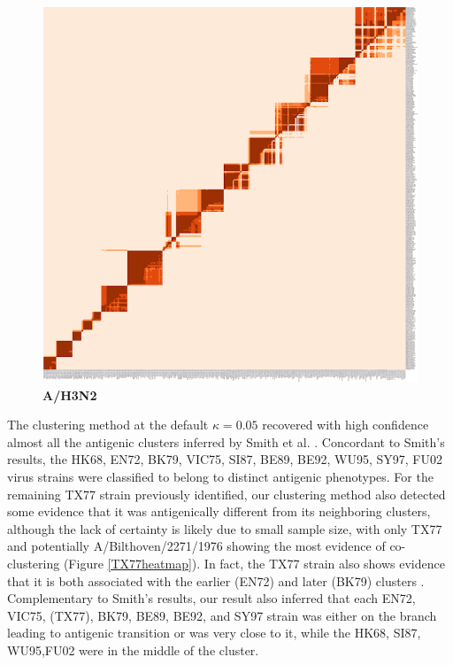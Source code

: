 \documentclass[11pt,oneside,letterpaper]{article}
\begin{document}
\begin{figure}[h]
	\centering		
	\includegraphics[width=1\textwidth]{figures/custom/H3N2Heatmap}
	\caption{\textbf{A/H3N2}
	 		} 
	\label{H3N2heatmap} 
\end{figure}



The clustering method at the default $\kappa=0.05$ recovered with high confidence almost all the  antigenic clusters inferred by Smith et al. \cite{smith_mapping_2004}. 
Concordant to Smith's results, the HK68, EN72, BK79, VIC75, SI87, BE89, BE92, WU95, SY97, FU02 virus strains were classified to belong to distinct antigenic phenotypes. %
For the remaining TX77 strain previously identified, our clustering method also detected some evidence that it was antigenically different from its neighboring clusters, although the lack of certainty is likely due to small sample size, with only TX77 and potentially A/Bilthoven/2271/1976 showing the most evidence of co-clustering (Figure \ref{TX77heatmap}). %
In fact, the TX77 strain also shows evidence that it is both associated with the earlier (EN72) and later (BK79) clusters .
Complementary to Smith's results, our result also inferred that each EN72, VIC75, (TX77), BK79, BE89, BE92, and SY97 strain was either on the branch leading to antigenic transition or was very close to it, while the HK68, SI87, WU95,FU02 were in the middle of the cluster. 
\end{document}
